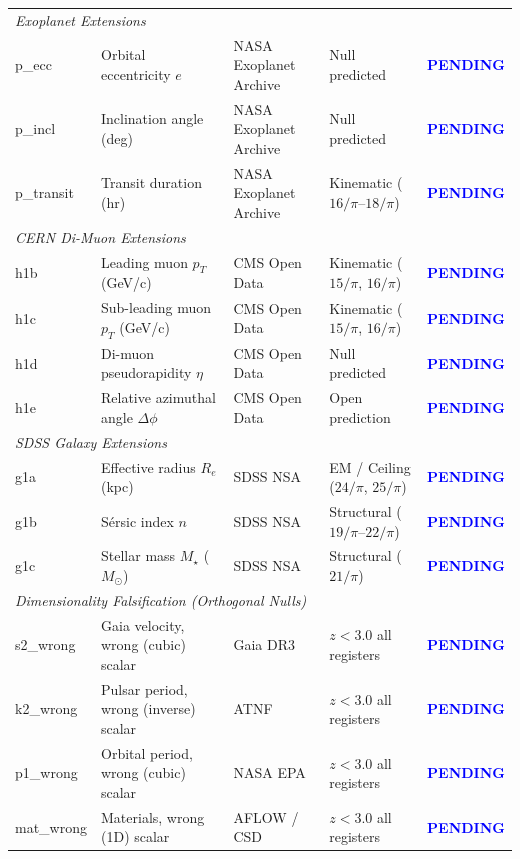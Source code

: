 \documentclass[12pt,a4paper]{article}
\newcommand{\pending}{\textcolor{blue}{\textbf{PENDING}}}
\begin{document}
\begin{longtable}{p{1.5cm} p{5.0cm} p{3.0cm} p{3.5cm} p{1.5cm}}
\multicolumn{5}{l}{\textit{Exoplanet Extensions}}\\[0.2em]
p\_ecc & Orbital eccentricity $e$ & NASA Exoplanet Archive & Null predicted & \pending \\
p\_incl & Inclination angle (deg) & NASA Exoplanet Archive & Null predicted & \pending \\
p\_transit & Transit duration (hr) & NASA Exoplanet Archive & Kinematic ($16/\pi$--$18/\pi$) & \pending \\[0.3em]

\multicolumn{5}{l}{\textit{CERN Di-Muon Extensions}}\\[0.2em]
h1b & Leading muon $p_T$ (GeV/c) & CMS Open Data & Kinematic ($15/\pi$, $16/\pi$) & \pending \\
h1c & Sub-leading muon $p_T$ (GeV/c) & CMS Open Data & Kinematic ($15/\pi$, $16/\pi$) & \pending \\
h1d & Di-muon pseudorapidity $\eta$ & CMS Open Data & Null predicted & \pending \\
h1e & Relative azimuthal angle $\Delta\phi$ & CMS Open Data & Open prediction & \pending \\[0.3em]

\multicolumn{5}{l}{\textit{SDSS Galaxy Extensions}}\\[0.2em]
g1a & Effective radius $R_e$ (kpc) & SDSS NSA & EM / Ceiling ($24/\pi$, $25/\pi$) & \pending \\
g1b & S\'{e}rsic index $n$ & SDSS NSA & Structural ($19/\pi$--$22/\pi$) & \pending \\
g1c & Stellar mass $M_\star$ ($M_\odot$) & SDSS NSA & Structural ($21/\pi$) & \pending \\[0.3em]

\multicolumn{5}{l}{\textit{Dimensionality Falsification (Orthogonal Nulls)}}\\[0.2em]
s2\_wrong & Gaia velocity, wrong (cubic) scalar & Gaia DR3 & $z < 3.0$ all registers & \pending \\
k2\_wrong & Pulsar period, wrong (inverse) scalar & ATNF & $z < 3.0$ all registers & \pending \\
p1\_wrong & Orbital period, wrong (cubic) scalar & NASA EPA & $z < 3.0$ all registers & \pending \\
mat\_wrong & Materials, wrong (1D) scalar & AFLOW / CSD & $z < 3.0$ all registers & \pending \\

\end{longtable}

\end{document}
